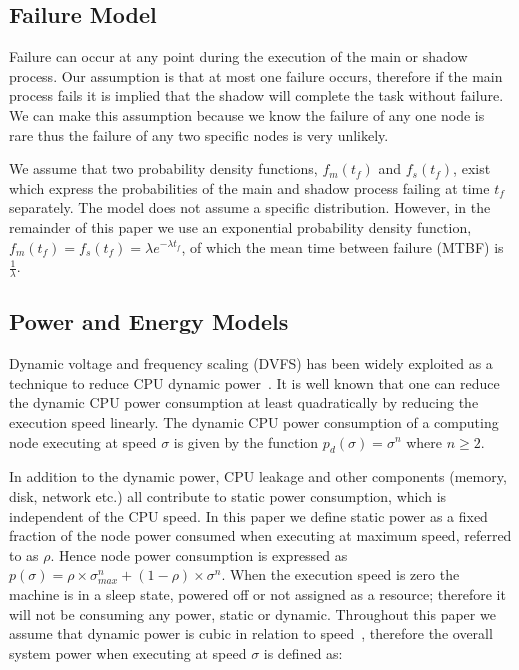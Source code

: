 \subsection{Failure Model}
Failure can occur at any point during the execution of the main or
shadow process. Our assumption is that at most one failure occurs,
therefore if the main process fails it is implied that the shadow will
complete the task without failure. We can make this assumption because
we know the failure of any one node is rare thus the failure
of any two specific nodes is very unlikely.


We assume that two probability density functions, $f_m(t_f)$ and
$f_s(t_f)$, exist which express the probabilities of the main and shadow
process failing at time $t_f$ separately. The model does not assume a
specific distribution. However, in the remainder of this paper we use
an exponential probability density function, $f_m(t_f)=f_s(t_f)=\lambda
e^{-\lambda t_f}$, of which the mean time between failure (MTBF) is $\frac{1}{\lambda}$.

\subsection{Power and Energy Models}
Dynamic voltage and frequency scaling
(DVFS) has
been widely exploited as a technique to reduce CPU dynamic power~\cite{flautner_2002_APS,pillai_2001_sosp}. It
is well known that one can reduce the dynamic CPU power consumption at
least quadratically by reducing the execution speed linearly. The
dynamic CPU power consumption of a computing node executing at speed
$\sigma$ is given by the function $p_d(\sigma)=\sigma^n$ where $n \ge
2$.

In addition to the dynamic power, CPU leakage and other components
(memory, disk, network etc.) all contribute to static power
consumption, which is independent of the CPU speed. In this paper we
define static power as a fixed fraction of the node power consumed
when executing at maximum speed, referred to as $\rho$. Hence node
power consumption is expressed as
$p(\sigma)=\rho \times \sigma_{max}^n + (1-\rho)\times \sigma^n$. When the execution speed is zero
the machine is in a sleep state, powered off or not assigned as a
resource; therefore it will not be consuming any power, static or
dynamic.  Throughout this paper we assume that dynamic power is cubic
in relation to
speed~\cite{rusu_2003_ecs,zhai_2004_dac}, therefore the
overall system power when executing at speed $\sigma$ is defined as:

